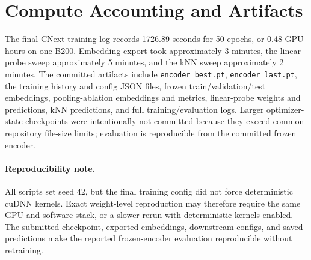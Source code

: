 \documentclass{article}
\begin{document}
\section{Compute Accounting and Artifacts}

\begin{center}
\captionsetup{hypcap=false}
\label{tab:compute}
\end{center}

The final CNext training log records 1726.89 seconds for 50 epochs, or 0.48 GPU-hours on one B200. Embedding export took approximately 3 minutes, the linear-probe sweep approximately 5 minutes, and the kNN sweep approximately 2 minutes. The committed artifacts include \texttt{encoder\_best.pt}, \texttt{encoder\_last.pt}, the training history and config JSON files, frozen train/validation/test embeddings, pooling-ablation embeddings and metrics, linear-probe weights and predictions, kNN predictions, and full training/evaluation logs. Larger optimizer-state checkpoints were intentionally not committed because they exceed common repository file-size limits; evaluation is reproducible from the committed frozen encoder.

\paragraph{Reproducibility note.}
All scripts set seed 42, but the final training config did not force deterministic cuDNN kernels. Exact weight-level reproduction may therefore require the same GPU and software stack, or a slower rerun with deterministic kernels enabled. The submitted checkpoint, exported embeddings, downstream configs, and saved predictions make the reported frozen-encoder evaluation reproducible without retraining.
\end{document}
